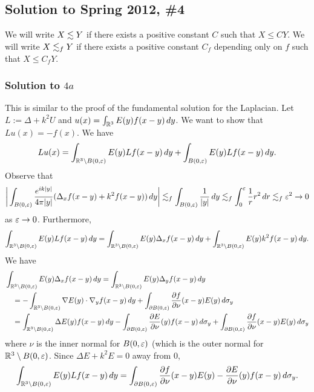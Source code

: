 \subsection*{Solution to Spring 2012, \#4}\label{s124}
We will write $X \lesssim Y$ if there exists
a positive constant $C$ such that $X \leq CY$. We will write $X \lesssim_{f} Y$ if there exists a positive constant $C_{f}$ depending
only on $f$ such that $X \leq C_{f}Y$.
\subsubsection*{Solution to $4a$}
This is similar to the proof of the fundamental solution for the Laplacian. Let $L:= \Delta + k^{2}U$ and $u(x) = \int_{\mathbb{R}^{3}}E(y)f(x - y)\, dy$.
We want to show that $Lu(x) = -f(x)$. We have
\begin{align*}
Lu(x) = \int_{\mathbb{R}^{3}\setminus B(0, \varepsilon)}E(y)Lf(x - y)\, dy + \int_{B(0, \varepsilon)}E(y)Lf(x - y)\, dy.
\end{align*}
Observe that
\begin{align*}
\bigg| \int_{B(0, \varepsilon)}\frac{e^{ik|y|}}{4\pi|y|}(\Delta_{x}f(x - y) + k^{2}f(x - y))\, dy \bigg| \lesssim_{f}\int_{B(0, \varepsilon)}\frac{1}{|y|}\, dy \lesssim_{f}\int_{0}^{\varepsilon}\frac{1}{r}r^{2}\, dr\lesssim_{f} \varepsilon^{2} \rightarrow 0
\end{align*}
as $\varepsilon \rightarrow 0$. Furthermore,
\begin{align*}
\int_{\mathbb{R}^{3}\setminus B(0, \varepsilon)}E(y)Lf(x - y)\, dy = \int_{\mathbb{R}^{3}\setminus B(0, \varepsilon)}E(y)\Delta_{x}f(x - y)\, dy + \int_{\mathbb{R}^{3}\setminus B(0, \varepsilon)}E(y)k^{2}f(x - y)\, dy.
\end{align*}
We have
\begin{align*}
&\int_{\mathbb{R}^{3}\setminus B(0, \varepsilon)}E(y)\Delta_{x}f(x - y)\, dy= \int_{\mathbb{R}^{3}\setminus B(0, \varepsilon)}E(y)\Delta_{y}f(x - y)\, dy\\
&\quad= -\int_{\mathbb{R}^{3}\setminus B(0, \varepsilon)}\nabla E(y) \cdot \nabla_{y}f(x - y)\, dy + \int_{\partial B(0, \varepsilon)}\frac{\partial f}{\partial\nu}(x - y)E(y)\, d\sigma_{y}\\
&\quad= \int_{\mathbb{R}^{3}\setminus B(0, \varepsilon)}\Delta E(y)f(x - y)\, dy - \int_{\partial B(0, \varepsilon)}\frac{\partial E}{\partial \nu}(y)f(x - y)\, d\sigma_{y} + \int_{\partial B(0, \varepsilon)}\frac{\partial f}{\partial\nu}(x - y)E(y)\, d\sigma_{y}
\end{align*}
where $\nu$ is the inner normal for $B(0, \varepsilon)$ (which is the outer normal for $\mathbb{R}^{3}\setminus B(0, \varepsilon)$.
Since $\Delta E + k^{2}E = 0$ away from $0$,
\begin{align*}
\int_{\mathbb{R}^{3}\setminus B(0, \varepsilon)}E(y)Lf(x - y)\, dy = \int_{\partial B(0, \varepsilon)}\frac{\partial f}{\partial \nu}(x - y)E(y) - \frac{\partial E}{\partial \nu}(y)f(x - y)\, d\sigma_{y}.
\end{align*}
